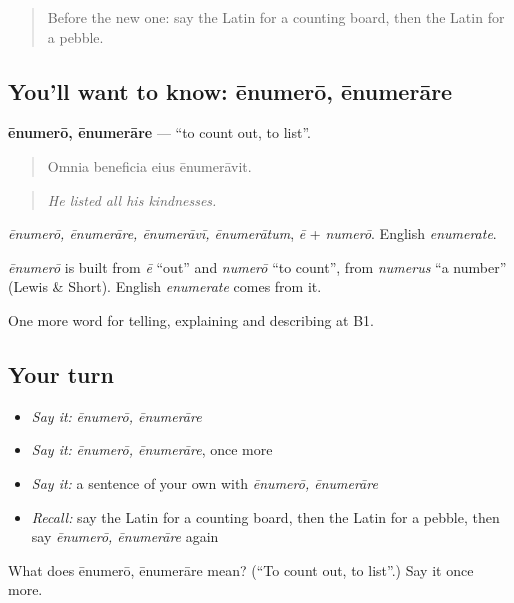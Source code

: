 \begin{quote}
Before the new one: say the Latin for a counting board, then the Latin for a pebble.
\end{quote}

\subsection*{You'll want to know: ēnumerō, ēnumerāre}
\textbf{ēnumerō, ēnumerāre} — \textquotedblleft{}to count out, to list\textquotedblright{}.

\begin{quote}
Omnia beneficia eius ēnumerāvit.
\end{quote}

\begin{quote}
\emph{He listed all his kindnesses.}
\end{quote}

\emph{ēnumerō, ēnumerāre, ēnumerāvī, ēnumerātum}, \emph{ē} + \emph{numerō}. English \emph{enumerate}.

\begin{cousinweb}
\emph{ēnumerō} is built from \emph{ē} \textquotedblleft{}out\textquotedblright{} and \emph{numerō} \textquotedblleft{}to count\textquotedblright{}, from \emph{numerus} \textquotedblleft{}a number\textquotedblright{} (Lewis \& Short). English \emph{enumerate} comes from it.
\end{cousinweb}

\begin{grammarlens}[title={What you've built}]
One more word for telling, explaining and describing at B1.
\end{grammarlens}

\subsection*{Your turn}
\begin{itemize}
\raggedright
  \item \emph{Say it:} \emph{ēnumerō, ēnumerāre}
  \item \emph{Say it:} \emph{ēnumerō, ēnumerāre}, once more
  \item \emph{Say it:} a sentence of your own with \emph{ēnumerō, ēnumerāre}
  \item \emph{Recall:} say the Latin for a counting board, then the Latin for a pebble, then say \emph{ēnumerō, ēnumerāre} again
\end{itemize}

\begin{tcolorbox}[breakable,colback=teal!4,colframe=teal!35!black,title={Before you move on}]
What does ēnumerō, ēnumerāre mean? (\textquotedblleft{}To count out, to list\textquotedblright{}.) Say it once more.
\end{tcolorbox}
